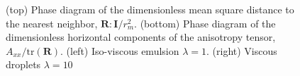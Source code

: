 \begin{figure}[h!]
    \caption{
        (top) Phase diagram of the dimensionless mean square distance to the nearest neighbor, $\textbf{R}:\textbf{I}/r_m^2$.
        (bottom) Phase diagram of the dimensionless horizontal components of the anisotropy tensor, $A_{xx}/\text{tr}(\textbf{R})$.  
        (left) Iso-viscous emulsion $\lambda = 1$.
        (right) Viscous droplets $\lambda = 10$ }
    \label{fig:phase}
\end{figure}

